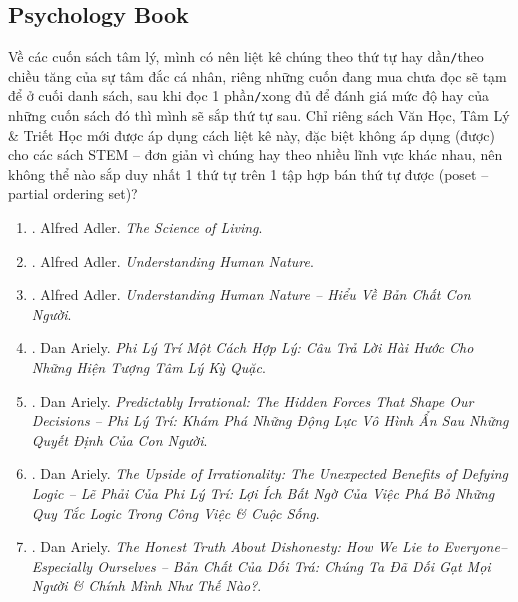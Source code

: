 \documentclass{article}
\begin{document}
\subsection{Psychology Book}
Về các cuốn sách tâm lý, mình có nên liệt kê chúng theo thứ tự hay dần{\tt/}theo chiều tăng của sự tâm đắc cá nhân, riêng những cuốn đang mua chưa đọc sẽ tạm để ở cuối danh sách, sau khi đọc 1 phần{\tt/}xong đủ để đánh giá mức độ hay của những cuốn sách đó thì mình sẽ sắp thứ tự sau. Chỉ riêng sách Văn Học, Tâm Lý \& Triết Học mới được áp dụng cách liệt kê này, đặc biệt không áp dụng (được) cho các sách STEM -- đơn giản vì chúng hay theo nhiều lĩnh vực khác nhau, nên không thể nào sắp duy nhất 1 thứ tự trên 1 tập hợp bán thứ tự được (poset -- partial ordering set)?
\begin{enumerate}
	\item \cite{Adler_science_living}. Alfred Adler. {\it The Science of Living}.\hfill{\sf[done]}
	
	\item \cite{Adler_human_nature}. {\sc Alfred Adler}. {\it Understanding Human Nature}.\hfill{\sf[done]}
	
	\item \cite{Adler_human_nature_VN}. {\sc Alfred Adler}. {\it Understanding Human Nature -- Hiểu Về Bản Chất Con Người}.\hfill{\sf[done]}
		
	\item \cite{Ariely_reasonably_irrational}. Dan Ariely. {\it Phi Lý Trí Một Cách Hợp Lý: Câu Trả Lời Hài Hước Cho Những Hiện Tượng Tâm Lý Kỳ Quặc}.\hfill{\sf[done]}
	
	\item \cite{Ariely_predictably_irrational}. Dan Ariely. {\it Predictably Irrational: The Hidden Forces That Shape Our Decisions -- Phi Lý Trí: Khám Phá Những Động Lực Vô Hình Ẩn Sau Những Quyết Định Của Con Người}.\hfill{\sf[done]}
	
	\item \cite{Ariely_upside_rationality}. Dan Ariely. {\it The Upside of Irrationality: The Unexpected Benefits of Defying Logic -- Lẽ Phải Của Phi Lý Trí: Lợi Ích Bất Ngờ Của Việc Phá Bỏ Những Quy Tắc Logic Trong Công Việc \& Cuộc Sống}.\hfill{\sf[done]}
	
	\item \cite{Ariely_dishonesty}. Dan Ariely. {\it The Honest Truth About Dishonesty: How We Lie to Everyone--Especially Ourselves -- Bản Chất Của Dối Trá: Chúng Ta Đã Dối Gạt Mọi Người \& Chính Mình Như Thế Nào?}.\hfill{\sf[done]}
	

\end{enumerate}
\end{document}
